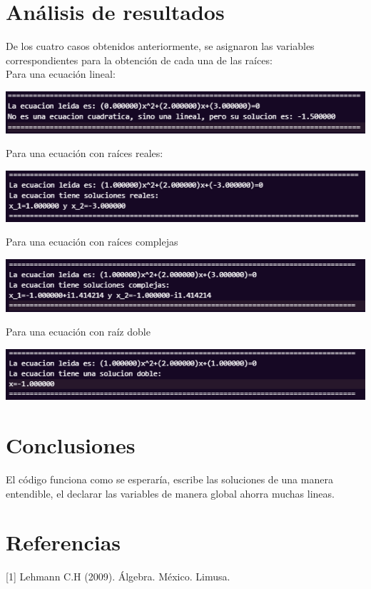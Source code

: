 \documentclass{article}
\begin{document}
	\begin{multicols}{2}
		\section{Análisis  de resultados}
			De los cuatro casos obtenidos anteriormente, se asignaron las variables correspondientes para la obtención de cada una de las raíces:\\
			Para una ecuación lineal: 
			\begin{center}
				\includegraphics[scale=0.63]{Caso1.png}
			\end{center}
			Para una ecuación con raíces reales:
			\begin{center}
				\includegraphics[scale=0.63]{Caso2.png}
			\end{center}
			Para una ecuación con raíces complejas
			\begin{center}
				\includegraphics[scale=0.63]{Caso3.png}
			\end{center}
			Para una ecuación con raíz doble
			\begin{center}
				\includegraphics[scale=0.63]{Caso4.png}
			\end{center}

		\section{Conclusiones}
			El código funciona como se esperaría, escribe las soluciones de una manera entendible, el declarar las variables de manera global ahorra muchas lineas.

		\section{Referencias }
			[1] Lehmann C.H (2009). Álgebra. México. Limusa.
	\end{multicols}
\end{document}
